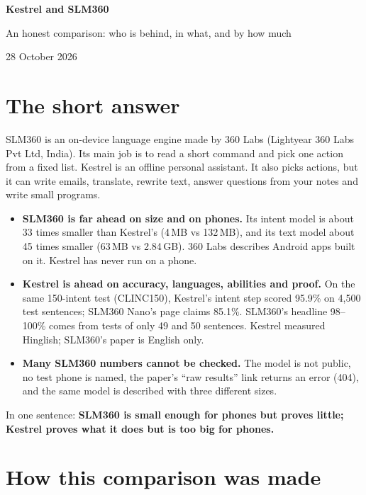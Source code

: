 \documentclass[11pt,a4paper]{article}
\begin{document}
\begin{center}
{\LARGE\bfseries Kestrel and SLM360\par}
\vspace{4pt}
{\large An honest comparison: who is behind, in what, and by how much\par}
\vspace{6pt}
{\color{note}28 October 2026\par}
\end{center}
\vspace{6pt}

\section*{The short answer}

SLM360 is an on-device language engine made by 360 Labs (Lightyear 360 Labs Pvt Ltd, India). Its main job is to read
a short command and pick one action from a fixed list. Kestrel is an offline personal assistant. It also picks
actions, but it can write emails, translate, rewrite text, answer questions from your notes and write small programs.

\begin{itemize}
  \item \textbf{SLM360 is far ahead on size and on phones.} Its intent model is about 33 times smaller than Kestrel's
  (4\,MB vs 132\,MB), and its text model about 45 times smaller (63\,MB vs 2.84\,GB). 360 Labs describes Android apps
  built on it. Kestrel has never run on a phone.
  \item \textbf{Kestrel is ahead on accuracy, languages, abilities and proof.} On the same 150-intent test
  (CLINC150), Kestrel's intent step scored 95.9\% on 4,500 test sentences; SLM360 Nano's page claims 85.1\%. SLM360's
  headline 98--100\% comes from tests of only 49 and 50 sentences. Kestrel measured Hinglish; SLM360's paper is
  English only.
  \item \textbf{Many SLM360 numbers cannot be checked.} The model is not public, no test phone is named, the paper's
  ``raw results'' link returns an error (404), and the same model is described with three different sizes.
\end{itemize}

\noindent In one sentence: \textbf{SLM360 is small enough for phones but proves little; Kestrel proves what it does
but is too big for phones.}

\section{How this comparison was made}
\end{document}
